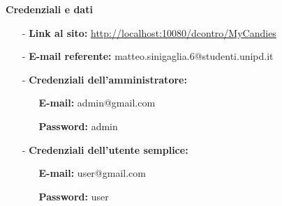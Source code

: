 \begin{titlepage}
\begin{center}
        \begin{minipage}[t]{0.7\textwidth}
            \centering\textbf{\large Credenziali e dati}
                \vspace{0.5cm}
                \begin{itemize}
                    \item[-] \textbf{Link al sito:} \url{http://localhost:10080/dcontro/MyCandies}
                    \item[-] \textbf{E-mail referente:} matteo.sinigaglia.6@studenti.unipd.it
                    \item[-] \textbf{Credenziali dell'amministratore:} 
                        \begin{itemize}
                            \item[] \textbf{E-mail:}   admin@gmail.com
                            \item[] \textbf{Password:} admin
                        \end{itemize}
                    \item[-] \textbf{Credenziali dell'utente semplice:} 
                        \begin{itemize}
                            \item[] \textbf{E-mail:}   user@gmail.com
                            \item[] \textbf{Password:} user
                        \end{itemize}
                \end{itemize}
        \end{minipage}
   \end{center}
\end{titlepage}